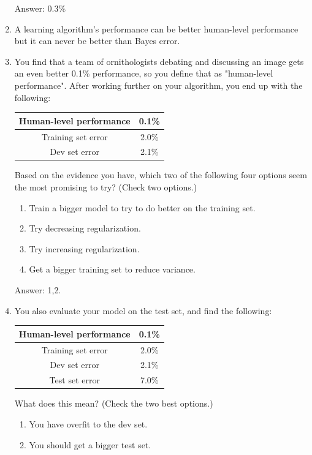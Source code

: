 \documentclass[12pt]{article}
\numberwithin{equation}{section}
\begin{document}
\begin{enumerate}
	Answer: 0.3\% 
	\item A learning algorithm's performance can be better human-level performance but it can never be better than Bayes error.
	\item You find that a team of ornithologists debating and discussing an image gets an even better 0.1\% performance, so you define that as "human-level performance". After working further on your algorithm, you end up with the following:
	\begin{table}[h!]
  		\centering
  		\begin{tabular}{c|c}
    			Human-level performance & 0.1\% \\ \hline
			Training set error & 2.0\% \\ \hline
			Dev set error & 2.1\% \\ 
  		\end{tabular}
	\end{table} \par
	Based on the evidence you have, which two of the following four options seem the most promising to try? (Check two options.)
	\begin{enumerate}
		\item Train a bigger model to try to do better on the training set.
		\item Try decreasing regularization.
		\item Try increasing regularization.
		\item Get a bigger training set to reduce variance.
	\end{enumerate} \par
	Answer: 1,2.
	\item You also evaluate your model on the test set, and find the following:
	\begin{table}[h!]
  		\centering
  		\begin{tabular}{c|c}
    			Human-level performance & 0.1\% \\ \hline
			Training set error & 2.0\% \\ \hline
			Dev set error & 2.1\% \\ \hline
			Test set error & 7.0\% \\ 
  		\end{tabular}
	\end{table} \par
	What does this mean? (Check the two best options.)
	\begin{enumerate}
		\item You have overfit to the dev set.
		\item You should get a bigger test set.

\end{enumerate}
\end{enumerate}
\end{document}

